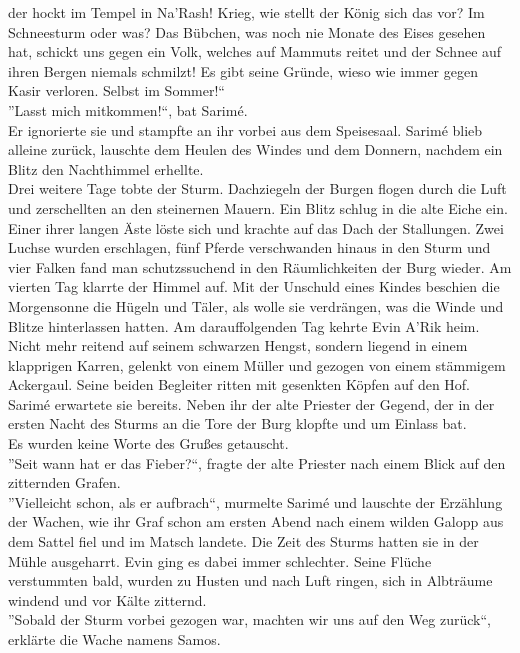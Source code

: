 der hockt im Tempel in Na'Rash! Krieg, wie stellt der König sich das vor? Im Schneesturm oder was? 
Das Bübchen, was noch nie Monate des Eises gesehen hat, schickt uns gegen ein Volk, welches auf 
Mammuts reitet und der Schnee auf ihren Bergen niemals schmilzt! Es gibt seine Gründe, wieso wie 
immer gegen Kasir verloren. Selbst im Sommer!``\\
''Lasst mich mitkommen!``, bat Sarimé.\\
Er ignorierte sie und stampfte an ihr vorbei aus dem Speisesaal. Sarimé blieb alleine zurück, 
lauschte dem Heulen des Windes und dem Donnern, nachdem ein Blitz den Nachthimmel erhellte.\\


Drei weitere Tage tobte der Sturm. Dachziegeln der Burgen flogen durch die Luft und zerschellten an 
den steinernen Mauern. Ein Blitz schlug in die alte Eiche ein. Einer ihrer langen Äste löste sich 
und krachte auf das Dach der Stallungen. Zwei Luchse wurden erschlagen, fünf Pferde verschwanden 
hinaus in den Sturm und vier Falken fand man schutzssuchend in den Räumlichkeiten der Burg wieder. 
Am vierten Tag klarrte der Himmel auf. Mit der Unschuld eines Kindes beschien die Morgensonne die 
Hügeln und Täler, als wolle sie verdrängen, was die Winde und Blitze hinterlassen hatten. Am 
darauffolgenden Tag kehrte Evin A'Rik heim. Nicht mehr reitend auf seinem schwarzen Hengst, sondern 
liegend in einem klapprigen Karren, gelenkt von einem Müller und gezogen von einem stämmigem 
Ackergaul. Seine beiden Begleiter ritten mit gesenkten Köpfen auf den Hof. Sarimé erwartete sie 
bereits. Neben ihr der alte Priester der Gegend, der in der ersten Nacht des Sturms an die Tore der 
Burg klopfte und um Einlass bat.\\
Es wurden keine Worte des Grußes getauscht.\\
''Seit wann hat er das Fieber?``, fragte der alte Priester nach einem Blick auf den zitternden 
Grafen.\\
''Vielleicht schon, als er aufbrach``, murmelte Sarimé und lauschte der Erzählung der Wachen, wie 
ihr Graf schon am ersten Abend nach einem wilden Galopp aus dem Sattel fiel und im Matsch landete. 
Die Zeit des Sturms hatten sie in der Mühle ausgeharrt. Evin ging es dabei immer schlechter. 
Seine Flüche verstummten bald, wurden zu Husten und nach Luft ringen, sich in Albträume windend und 
vor Kälte zitternd.\\
''Sobald der Sturm vorbei gezogen war, machten wir uns auf den Weg zurück``, erklärte die Wache 
namens Samos.\\
